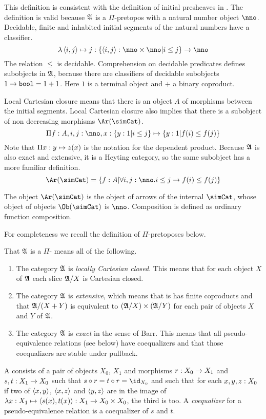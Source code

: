 \documentclass[csh.tex]{subfiles}
\begin{document}
This definition is consistent with the definition of initial presheaves in \citep{MR1300636}. The definition is valid because $\mathfrak A$ is a $\Pi$-pretopos with a natural number object $\nno$. Decidable, finite and inhabited initial segments of the natural numbers have a classifier.
\[  \function{\tuplet{i,j}}j\of\set{\tuplet{i,j}\of\nno\times\nno\middle|i\leq j}\to \nno \]
The relation $\leq$ is decidable. Comprehension on decidable predicates defines subobjects in $\mathfrak A$, because there are classifiers of decidable subobjects $1\to \mathtt{bool} = 1+1$. Here $1$ is a terminal object and $+$ a binary coproduct.

Local Cartesian closure means that there is an object $A$ of morphisms between the initial segments. Local Cartesian closure also implies that there is a subobject of non decreasing morphisms $\Ar(\simCat)$.
\[ \product{f\of A,i,j\of\nno,x\of\set{y\of 1|i\leq j}}{\set{y\of 1|f(i)\leq f(j)}}\]
Note that $\Pi x: y \mapsto z(x)$ is the notation for the dependent product. 
Because $\mathfrak A$ is also exact and extensive, it is a Heyting category, so the same subobject has a more familiar definition.
\[ \Ar(\simCat)=\set{f\of A|\forall i,j\of\nno.i\leq j \to f(i)\leq f(j)} \]

\begin{definition} The object $\Ar(\simCat)$ is the object of arrows of the internal  $\simCat$, whose object of objects $\Ob(\simCat)$ is $\nno$. Composition is defined as ordinary function composition.
\end{definition}

For completeness we recall the definition of $\Pi$-pretoposes below.

\begin{definition} 
That $\mathfrak A$ is a $\Pi$- means all of the following.

\begin{enumerate}
\item The category $\mathfrak A$ is \emph{locally Cartesian closed}. This means that for each object $X$ of $\mathfrak A$ each slice $\mathfrak A/X$ is Cartesian closed.
\item The category $\mathfrak A$ is \emph{extensive}, which means that is has finite coproducts and that $\mathfrak A/(X+Y)$ is equivalent to $(\mathfrak A/X)\times(\mathfrak A/Y)$ for each pair of objects $X$ and $Y$ of $\mathfrak A$.
\item The category $\mathfrak A$ is \emph{exact} in the sense of Barr. This means that all pseudo-equivalence relations (see below) have coequalizers and that those coequalizers are stable under pullback.
\end{enumerate}

A  consists of a pair of objects $X_0$, $X_1$ and morphisms $r: X_0\to X_1$ and $s,t: X_1\to X_0$ such that $s\circ r= t\circ r = \id_{X_0}$ and such that for each $x,y,z: X_0$ if two of $\left\langle x,y \right\rangle$, $\left\langle x,z \right\rangle$ and $\left\langle y,z \right\rangle$ are in the image of $\lambda x: X_1 \mapsto \left\langle s(x),t(x) \right\rangle: X_1\to X_0\times X_0$, the third is too. A \emph{coequalizer} for a pseudo-equivalence relation is a coequalizer of $s$ and $t$.
\end{definition}
\end{document}
